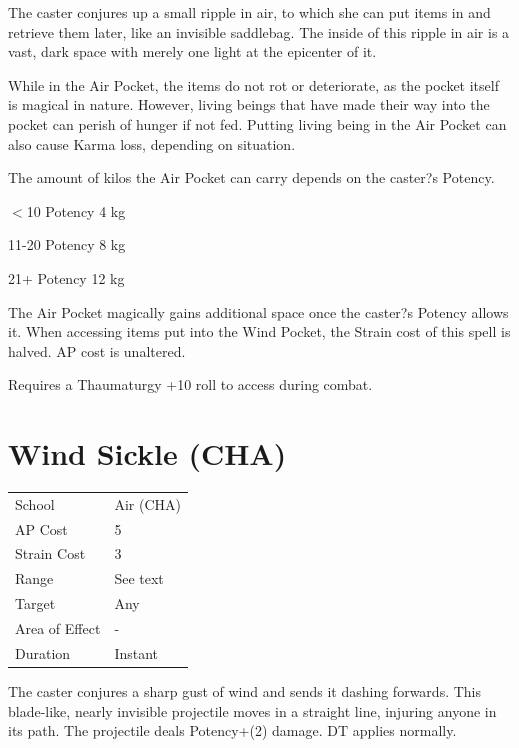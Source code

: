 \documentclass[11pt,a4paper,twocolumn]{book}
\begin{document}
	\medskip
	
	The caster conjures up a small ripple in air, to which she can put items in and retrieve them later, like an invisible saddlebag. The inside of this ripple in air is a vast, dark space with merely one light at the epicenter of it.
	
	While in the Air Pocket, the items do not rot or deteriorate, as the pocket itself is magical in nature. However, living beings that have made their way into the pocket can perish of hunger if not fed. Putting living being in the Air Pocket can also cause Karma loss, depending on situation. 
	
	The amount of kilos the Air Pocket can carry depends on the caster?s Potency.

	\begin{compactitem}
		\item $<$10 Potency 		4 kg
		\item 11-20 Potency 		8 kg
		\item 21+ Potency 			12 kg
	\end{compactitem}
	
	The Air Pocket magically gains additional space once the caster?s Potency allows it. When accessing items put into the Wind Pocket, the Strain cost of this spell is halved. AP cost is unaltered.
	
	Requires a Thaumaturgy +10 roll to access during combat.
	
								\section*{Wind Sickle (CHA)}
	{
		\begin{tabu} to 75mm{| X[l,4] | X[l,7] |}
			\hline
			School 			&  Air (CHA)			\\
			AP Cost	      	&  5					\\
			Strain Cost     &  3					\\
			Range     		&  See text				\\
			Target      	&  Any					\\
			Area of Effect  &  -	 				\\
			Duration     	&  Instant				\\ \hline
		\end{tabu}
		
	}
	
	\medskip
	
	The caster conjures a sharp gust of wind and sends it dashing forwards. This blade-like, nearly invisible projectile moves in a straight line, injuring anyone in its path. The projectile deals Potency+(2) damage. DT applies normally.
	
\end{document}
